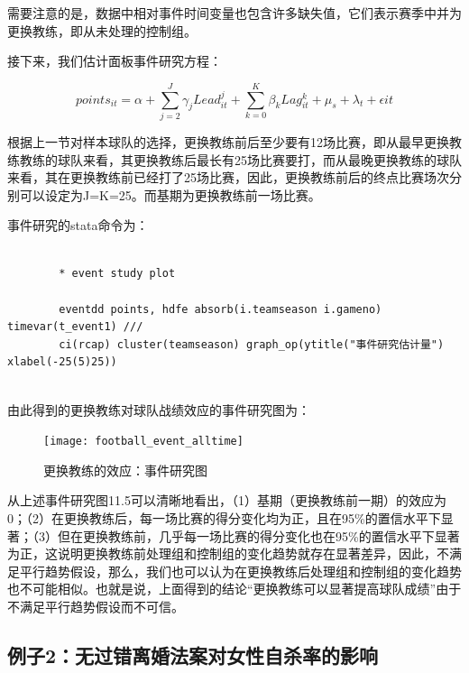 \documentclass[cn,12pt,math=newtx,citestyle=gb7714-2015,bibstyle=gb7714-2015]{elegantbook}
\begin{document}
	  需要注意的是，数据中相对事件时间变量也包含许多缺失值，它们表示赛季中并为更换教练，即从未处理的控制组。
	  
	  接下来，我们估计面板事件研究方程：
	  
	   \begin{equation}
	  	points_{it}=\alpha+\sum_{j=2}^J \gamma_j Lead_{it}^j +\sum_{k=0}^K \beta_k Lag_{it}^k +\mu_s +\lambda_t  +\epsilon{it}
	  \end{equation}
	  
	  根据上一节对样本球队的选择，更换教练前后至少要有12场比赛，即从最早更换教练教练的球队来看，其更换教练后最长有25场比赛要打，而从最晚更换教练的球队来看，其在更换教练前已经打了25场比赛，因此，更换教练前后的终点比赛场次分别可以设定为J=K=25。而基期为更换教练前一场比赛。
	  
	  事件研究的stata命令为：
	  
	  \begin{lstlisting}
	  	
	  	* event study plot
	  	
	  	eventdd points, hdfe absorb(i.teamseason i.gameno) timevar(t_event1) ///
	  	ci(rcap) cluster(teamseason) graph_op(ytitle("事件研究估计量") xlabel(-25(5)25))
	  	
	  \end{lstlisting}
	  
	  由此得到的更换教练对球队战绩效应的事件研究图为：
	  
	  \begin{figure}[tbph]
	  	\centering
	  	\texttt{[image: football\_event\_alltime]}
	  	\caption{更换教练的效应：事件研究图}
	  	\label{fig:footballeventalltime}
	  \end{figure}
	  
	  从上述事件研究图11.5可以清晰地看出，（1）基期（更换教练前一期）的效应为0；（2）在更换教练后，每一场比赛的得分变化均为正，且在95\%的置信水平下显著；（3）但在更换教练前，几乎每一场比赛的得分变化也在95\%的置信水平下显著为正，这说明更换教练前处理组和控制组的变化趋势就存在显著差异，因此，不满足平行趋势假设，那么，我们也可以认为在更换教练后处理组和控制组的变化趋势也不可能相似。也就是说，上面得到的结论“更换教练可以显著提高球队成绩”由于不满足平行趋势假设而不可信。
	  
	   \subsection*{例子2：无过错离婚法案对女性自杀率的影响}
	  
	  
	    
\end{document}
